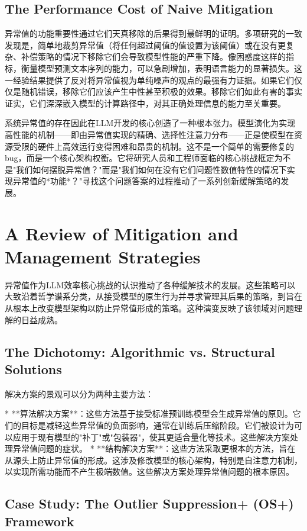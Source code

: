 \documentclass{article}
\begin{document}
\subsection{The Performance Cost of Naive Mitigation}

异常值的功能重要性通过它们天真移除的后果得到最鲜明的证明。多项研究的一致发现是，简单地裁剪异常值（将任何超过阈值的值设置为该阈值）或在没有更复杂、补偿策略的情况下移除它们会导致模型性能的严重下降。像困惑度这样的指标，衡量模型预测文本序列的能力，可以急剧增加，表明语言能力的显著损失。这一经验结果提供了反对将异常值视为单纯噪声的观点的最强有力证据。如果它们仅仅是随机错误，移除它们应该产生中性甚至积极的效果。移除它们如此有害的事实证实，它们深深嵌入模型的计算路径中，对其正确处理信息的能力至关重要。

系统异常值的存在因此在LLM开发的核心创造了一种根本张力。模型演化为实现高性能的机制——即由异常值实现的精确、选择性注意力分布——正是使模型在资源受限的硬件上高效运行变得困难和昂贵的机制。这不是一个简单的需要修复的bug，而是一个核心架构权衡。它将研究人员和工程师面临的核心挑战框定为不是"我们如何摆脱异常值？"而是"我们如何在没有它们问题性数值特性的情况下实现异常值的*功能*？"寻找这个问题答案的过程推动了一系列创新缓解策略的发展。

\section{A Review of Mitigation and Management Strategies}

异常值作为LLM效率核心挑战的认识推动了各种缓解技术的发展。这些策略可以大致沿着哲学谱系分类，从接受模型的原生行为并寻求管理其后果的策略，到旨在从根本上改变模型架构以防止异常值形成的策略。这种演变反映了该领域对问题理解的日益成熟。

\subsection{The Dichotomy: Algorithmic vs. Structural Solutions}

解决方案的景观可以分为两种主要方法：

* **算法解决方案**：这些方法基于接受标准预训练模型会生成异常值的原则。它们的目标是减轻这些异常值的负面影响，通常在训练后压缩阶段。它们被设计为可以应用于现有模型的"补丁"或"包装器"，使其更适合量化等技术。这些解决方案处理异常值问题的症状。
* **结构解决方案**：这些方法采取更根本的方法，旨在从源头上防止异常值的形成。这涉及修改模型的核心架构，特别是自注意力机制，以实现所需功能而不产生极端数值。这些解决方案处理异常值问题的根本原因。

\subsection{Case Study: The Outlier Suppression+ (OS+) Framework}
\end{document}
